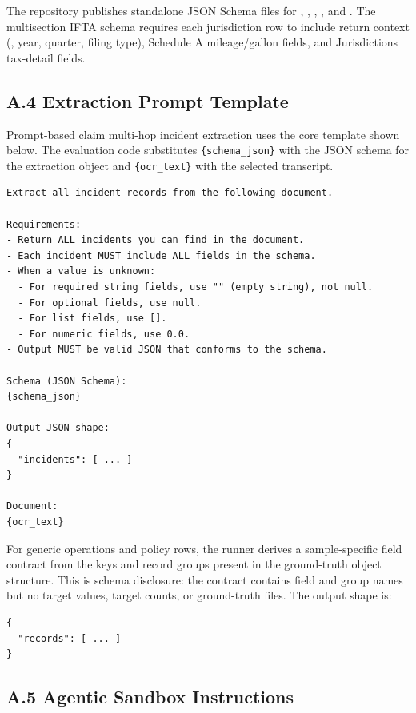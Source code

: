 \medskip
\noindent The repository publishes standalone JSON Schema files for , , , , and . The multisection IFTA schema requires each jurisdiction row to include return context (, year, quarter, filing type), Schedule A mileage/gallon fields, and Jurisdictions tax-detail fields.

\subsection*{A.4 Extraction Prompt Template}

Prompt-based claim multi-hop incident extraction uses the core template shown below. The evaluation code substitutes \texttt{\{schema\_json\}} with the JSON schema for the extraction object and \texttt{\{ocr\_text\}} with the selected transcript.

\begingroup
\small
\begin{verbatim}
Extract all incident records from the following document.

Requirements:
- Return ALL incidents you can find in the document.
- Each incident MUST include ALL fields in the schema.
- When a value is unknown:
  - For required string fields, use "" (empty string), not null.
  - For optional fields, use null.
  - For list fields, use [].
  - For numeric fields, use 0.0.
- Output MUST be valid JSON that conforms to the schema.

Schema (JSON Schema):
{schema_json}

Output JSON shape:
{
  "incidents": [ ... ]
}

Document:
{ocr_text}
\end{verbatim}
\endgroup

For generic operations and policy rows, the runner derives a sample-specific field contract from the keys and record groups present in the ground-truth object structure. This is schema disclosure: the contract contains field and group names but no target values, target counts, or ground-truth files. The output shape is:

\begingroup
\small
\begin{verbatim}
{
  "records": [ ... ]
}
\end{verbatim}
\endgroup

\subsection*{A.5 Agentic Sandbox Instructions}

